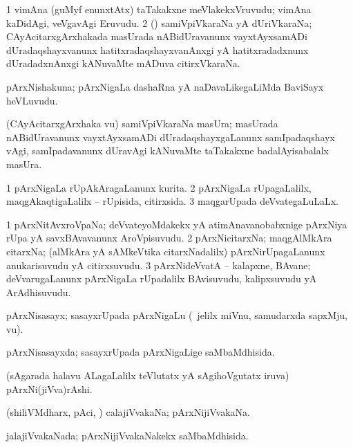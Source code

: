 \bentry
{} 
\gl{\nA} 
\bmng
\bnum
\num{1} vimAna (guMyf enunxtAtx) taTakakxne meVlakekxVruvudu; vimAna kaDidAgi, veVgavAgi Eruvudu. 
\num{2} (\CA) samiVpiVkaraNa yA dUriVkaraNa; CAyAcitarxgArxhakada masUrada nABidUravanunx vayxtAyxsamADi dUradaqshayxvanunx hatitxradaqshayxvanAnxgi yA hatitxradadxnunx dUradadxnAnxgi kANuvaMte mADuva citirxVkaraNa.
\enum
\emng
\eentry

\bentry
{} 
\gl{\nA} 
\bmng
pArxNishakuna; pArxNigaLa dashaRna yA naDavaLikegaLiMda BaviSayx heVLuvudu. 
\emng
\eentry

\bentry
{} 
\gl{\nA} 
\bmng
(CAyAcitarxgArxhaka \mo vu) samiVpiVkaraNa masUra; masUrada nABidUravanunx vayxtAyxsamADi dUradaqshayxgaLanunx samIpadaqshayx vAgi, samIpadavanunx dUravAgi kANuvaMte taTakakxne badalAyisabalalx masUra.
\emng
\eentry

\bentry
{} 
\gl{\gu} 
\bmng
\bnum
\num{1} pArxNigaLa rUpAkAragaLanunx kurita. 
\num{2} pArxNigaLa rUpagaLalilx, maqgAkaqtigaLalilx -- rUpisida, citirxsida. 
\num{3} maqgarUpada deVvategaLuLaLx.
\enum
\emng
\eentry

\bentry
{} 
\gl{\nA} 
\bmng
\bnum
\num{1} pArxNitAvxroVpaNa;  deVvateyoMdakekx yA atimAnavanobabxnige pArxNiya rUpa yA savxBAvavanunx AroVpisuvudu. 
\num{2} pArxNicitarxNa; maqgAlMkAra citarxNa; (alMkAra yA sAMkeVtika citarxNadalilx) pArxNirUpagaLanunx anukarisuvudu yA citirxsuvudu. 
\num{3} pArxNideVvatA -- kalapxne, BAvane; deVvarugaLanunx pArxNigaLa rUpadalilx BAvisuvudu, kalipxsuvudu yA ArAdhisuvudu.
\enum
\emng 
\eentry

\bentry
{} 
\gl{\nA} 
\bmng
pArxNisasayx; sasayxrUpada pArxNigaLu (\udA\ jelilx miVnu, samudarxda sapxMju, \mo vu).
\emng
\eentry

\bentry
{} 
\gl{\gu} 
\bmng
pArxNisasayxda; sasayxrUpada pArxNigaLige saMbaMdhisida.
\emng 
\eentry

\bentry
{} 
\gl{\nA} 
\bmng
(sAgarada halavu ALagaLalilx teVlutatx yA sAgihoVgutatx iruva) pArxNi(jiVva)rAshi.
\emng
\eentry

\bentry
{} 
\gl{\nA} 
\bmng
(shiliVMdharx, pAci, \mo) calajiVvakaNa; pArxNijiVvakaNa.
\emng
\eentry

\bentry
{} 
\gl{\gu} 
\bmng
jalajiVvakaNada; pArxNijiVvakaNakekx saMbaMdhisida.
\emng
\eentry

